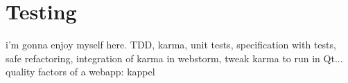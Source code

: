 \chapter{Testing}
i'm gonna enjoy myself here.
TDD, karma, unit tests, specification with tests, safe refactoring, integration of karma in webstorm, tweak karma to run in Qt...
quality factors of a webapp: kappel
